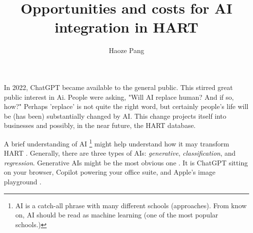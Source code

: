 \documentclass{scrartcl}
\begin{document}
\title{Opportunities and costs for AI integration in HART}
\author{Haoze Pang}
\maketitle

In 2022, ChatGPT became available to the general public.
This stirred great public interest in Ai. 
People were asking, "Will AI replace human? And if so, how?"
Perhaps 'replace' is not quite the right word, but certainly people's life will be (has been) substantially changed by AI.
This change projects itself into businesses and possibly, in the near future, the HART database.

A brief understanding of AI%
\footnote{%
AI is a catch-all phrase with many different schools (approaches). From know on, AI should be read as machine learning (one of the most popular schools.)
}
might help understand how it may transform HART \cite{DK86}.
Generally, there are three types of AIs: \emph{generative}, \emph{classification}, and \emph{regression}.
Generative AIs might be the most obvious one \cite{ImagePlayground}.
It is ChatGPT sitting on your browser, Copilot powering your office suite, and Apple's image playground \cite{DK89}.




\end{document}
